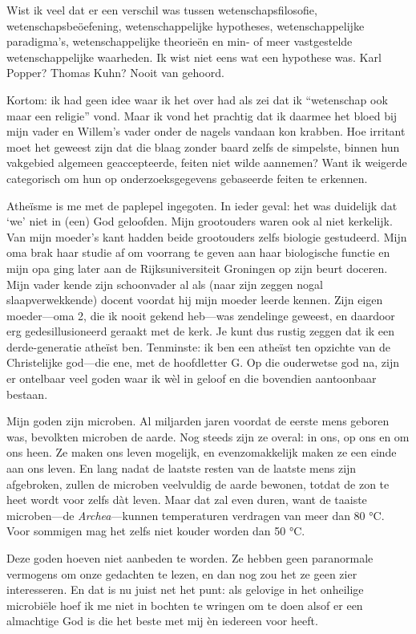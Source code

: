 \documentclass[12pt,a4paper]{article}
\begin{document}
Wist ik veel dat er een verschil was tussen wetenschapsfilosofie, weten\-schaps\-beöef\-ening, wetenschappelijke hypotheses, wetenschappelijke paradigma's, wetenschappelijke theorieën en min- of meer vastgestelde wetenschappelijke waarheden. Ik wist niet eens wat een hypothese was. Karl Popper? Thomas Kuhn? Nooit van gehoord.

Kortom: ik had geen idee waar ik het over had als zei dat ik “wetenschap ook maar een religie” vond. Maar ik vond het prachtig dat ik daarmee het bloed bij mijn vader en Willem's vader onder de nagels vandaan kon krabben. Hoe irritant moet het geweest zijn dat die blaag zonder baard zelfs de simpelste, binnen hun vakgebied algemeen geaccepteerde, feiten niet wilde aannemen? Want ik weigerde categorisch om hun op onderzoeksgegevens gebaseerde feiten te erkennen.

Atheïsme is me met de paplepel ingegoten. In ieder geval: het was duidelijk dat ‘we’ niet in (een) God geloofden. Mijn grootouders waren ook al niet kerkelijk. Van mijn moeder's kant hadden beide grootouders zelfs biologie gestudeerd. Mijn oma brak haar studie af om voorrang te geven aan haar biologische functie en mijn opa ging later aan de Rijksuniversiteit Groningen op zijn beurt doceren. Mijn vader kende zijn schoonvader al als (naar zijn zeggen nogal slaapverwekkende) docent voordat hij mijn moeder leerde kennen. Zijn eigen moeder—oma 2, die ik nooit gekend heb—was zendelinge geweest, en daardoor erg gedesillusioneerd geraakt met de kerk. Je kunt dus rustig zeggen dat ik een derde-generatie atheïst ben. Tenminste: ik ben een atheïst ten opzichte van de Christelijke god—die ene, met de hoofdletter G. Op die ouderwetse god na, zijn er ontelbaar veel goden waar ik wèl in geloof en die bovendien aantoonbaar bestaan.

Mijn goden zijn microben. Al miljarden jaren voordat de eerste mens geboren was, bevolkten microben de aarde. Nog steeds zijn ze overal: in ons, op ons en om ons heen. Ze maken ons leven mogelijk, en evenzomakkelijk maken ze een einde aan ons leven. En lang nadat de laatste resten van de laatste mens zijn afgebroken, zullen de microben veelvuldig de aarde bewonen, totdat de zon te heet wordt voor zelfs dàt leven. Maar dat zal even duren, want de taaiste microben—de \emph{Archea}—kunnen temperaturen verdragen van meer dan 80 °C. Voor sommigen mag het zelfs niet kouder worden dan 50 °C.

Deze goden hoeven niet aanbeden te worden. Ze hebben geen paranormale vermogens om onze gedachten te lezen, en dan nog zou het ze geen zier interesseren. En dat is nu juist net het punt: als gelovige in het onheilige microbiële hoef ik me niet in bochten te wringen om te doen alsof er een almachtige God is die het beste met mij èn iedereen voor heeft.
\end{document}
